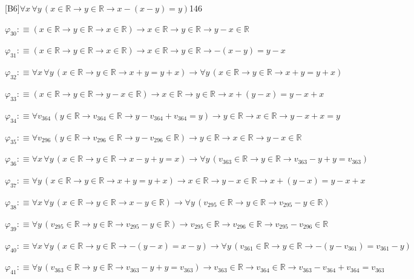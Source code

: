 \begin{fullproof}{[B6]}{$\forall x\,\forall y\,(x \in \mathbb{R} \to y \in \mathbb{R} \to x - (x - y) = y)$}{146}
\begin{abbrevlist}
\item $\varphi_{30} :\equiv (x \in \mathbb{R} \to y \in \mathbb{R} \to x \in \mathbb{R}) \to x \in \mathbb{R} \to y \in \mathbb{R} \to y - x \in \mathbb{R}$
\item $\varphi_{31} :\equiv (x \in \mathbb{R} \to y \in \mathbb{R} \to x \in \mathbb{R}) \to x \in \mathbb{R} \to y \in \mathbb{R} \to -(x - y) = y - x$
\item $\varphi_{32} :\equiv \forall x\,\forall y\,(x \in \mathbb{R} \to y \in \mathbb{R} \to x + y = y + x) \to \forall y\,(x \in \mathbb{R} \to y \in \mathbb{R} \to x + y = y + x)$
\item $\varphi_{33} :\equiv (x \in \mathbb{R} \to y \in \mathbb{R} \to y - x \in \mathbb{R}) \to x \in \mathbb{R} \to y \in \mathbb{R} \to x + (y - x) = y - x + x$
\item $\varphi_{34} :\equiv \forall v_{364}\,(y \in \mathbb{R} \to v_{364} \in \mathbb{R} \to y - v_{364} + v_{364} = y) \to y \in \mathbb{R} \to x \in \mathbb{R} \to y - x + x = y$
\item $\varphi_{35} :\equiv \forall v_{296}\,(y \in \mathbb{R} \to v_{296} \in \mathbb{R} \to y - v_{296} \in \mathbb{R}) \to y \in \mathbb{R} \to x \in \mathbb{R} \to y - x \in \mathbb{R}$
\item $\varphi_{36} :\equiv \forall x\,\forall y\,(x \in \mathbb{R} \to y \in \mathbb{R} \to x - y + y = x) \to \forall y\,(v_{363} \in \mathbb{R} \to y \in \mathbb{R} \to v_{363} - y + y = v_{363})$
\item $\varphi_{37} :\equiv \forall y\,(x \in \mathbb{R} \to y \in \mathbb{R} \to x + y = y + x) \to x \in \mathbb{R} \to y - x \in \mathbb{R} \to x + (y - x) = y - x + x$
\item $\varphi_{38} :\equiv \forall x\,\forall y\,(x \in \mathbb{R} \to y \in \mathbb{R} \to x - y \in \mathbb{R}) \to \forall y\,(v_{295} \in \mathbb{R} \to y \in \mathbb{R} \to v_{295} - y \in \mathbb{R})$
\item $\varphi_{39} :\equiv \forall y\,(v_{295} \in \mathbb{R} \to y \in \mathbb{R} \to v_{295} - y \in \mathbb{R}) \to v_{295} \in \mathbb{R} \to v_{296} \in \mathbb{R} \to v_{295} - v_{296} \in \mathbb{R}$
\item $\varphi_{40} :\equiv \forall x\,\forall y\,(x \in \mathbb{R} \to y \in \mathbb{R} \to -(y - x) = x - y) \to \forall y\,(v_{361} \in \mathbb{R} \to y \in \mathbb{R} \to -(y - v_{361}) = v_{361} - y)$
\item $\varphi_{41} :\equiv \forall y\,(v_{363} \in \mathbb{R} \to y \in \mathbb{R} \to v_{363} - y + y = v_{363}) \to v_{363} \in \mathbb{R} \to v_{364} \in \mathbb{R} \to v_{363} - v_{364} + v_{364} = v_{363}$

\end{abbrevlist}
\end{fullproof}
